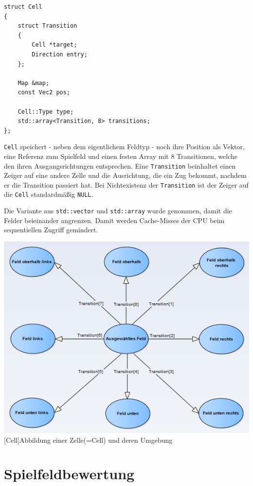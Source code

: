 \documentclass[12pt,a4paper]{article}
\begin{document}
\begin{lstlisting}[caption=\texttt{Cell} Struktur, label=lst:cell-struct]
struct Cell
{
	struct Transition
	{
		Cell *target;
		Direction entry;
	};
	
	Map &map;
	const Vec2 pos;
	
	Cell::Type type;
	std::array<Transition, 8> transitions;
};
\end{lstlisting}

\texttt{Cell} speichert - neben dem eigentlichem Feldtyp - noch ihre Position als Vektor, eine Referenz zum Spielfeld und einen festen Array mit 8 Transitionen, welche den ihren Ausgangsrichtungen entsprechen.
Eine \texttt{Transition} beinhaltet einen Zeiger auf eine andere Zelle und die Ausrichtung, die ein Zug bekommt, nachdem er die Transition passiert hat.
Bei Nichtexistenz der \texttt{Transition} ist der Zeiger auf die \texttt{Cell} standardmäßig \texttt{NULL}.

Die Variante aus \texttt{std::vector} und \texttt{std::array} wurde genommen, damit die Felder beieinander angrenzen. Damit werden Cache-Misses der CPU beim sequentiellen Zugriff gemindert.\newline

\begin{minipage}{\linewidth}
	\centering
	\includegraphics[width=0.4\linewidth]{pics/BRYX-Cell.PNG}
	[Cell]{Abbildung einer Zelle(=Cell) und deren Umgebung}
	\label{fig:cell}
\end{minipage}

\newpage
\section{Spielfeldbewertung}
\end{document}
